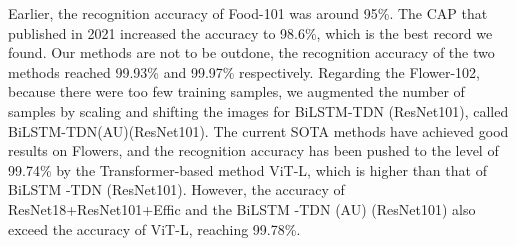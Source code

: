 \documentclass[10pt,twocolumn,letterpaper]{article}
\begin{document}
Earlier, the recognition accuracy of Food-101 was around 95\%. The CAP \cite{2021Context} that published in 2021 increased the accuracy to 98.6\%, which is the best record we found. Our methods are not to be outdone, the recognition accuracy of the two methods reached 99.93\% and 99.97\% respectively. Regarding the Flower-102, because there were too few training samples, we augmented the number of samples by scaling and shifting the images for BiLSTM-TDN (ResNet101), called BiLSTM-TDN(AU)(ResNet101). The current SOTA methods have achieved good results on Flowers, and the recognition accuracy has been pushed to the level of 99.74\% by the Transformer-based method ViT-L, which is higher than that of BiLSTM -TDN (ResNet101). However, the accuracy of ResNet18+ResNet101+Effic and the BiLSTM -TDN (AU) (ResNet101) also exceed the accuracy of ViT-L, reaching 99.78\%. 
\begin{table}[!htbp]
	\centering
	\caption{Recent results on Food-101} \label{Food101}
\end{table}						 
\end{document}
